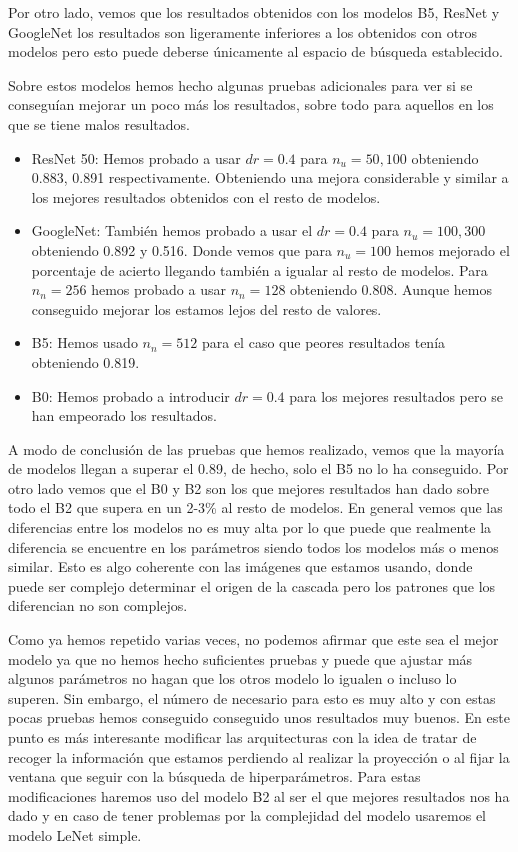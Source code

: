 \documentclass[a4paper,12pt,twoside,titlepage]{article}
\begin{document}
Por otro lado, vemos que los resultados obtenidos con los modelos B5, ResNet y GoogleNet los resultados son ligeramente inferiores a los obtenidos con otros modelos pero esto puede deberse únicamente al espacio de búsqueda establecido.

Sobre estos modelos hemos hecho algunas pruebas adicionales para ver si se conseguían mejorar un poco más los resultados, sobre todo para aquellos en los que se tiene malos resultados.

\begin{itemize}
  \item ResNet 50: Hemos probado a usar $dr = 0.4$ para $n_u = 50, 100$ obteniendo 0.883, 0.891 respectivamente. Obteniendo una mejora considerable y similar a los mejores resultados obtenidos con el resto de modelos.
  \item GoogleNet: También hemos probado a usar el $dr = 0.4$ para $n_u = 100, 300$ obteniendo 0.892 y 0.516. Donde vemos que para $n_u = 100$ hemos mejorado el porcentaje de acierto llegando también a igualar al resto de modelos. Para $n_n=256$ hemos probado a usar $n_n = 128$ obteniendo 0.808. Aunque hemos conseguido mejorar los estamos lejos del resto de valores.
  \item B5: Hemos usado $n_n = 512$ para el caso que peores resultados tenía obteniendo 0.819.
  \item B0: Hemos probado a introducir $dr = 0.4$ para los mejores resultados pero se han empeorado los resultados.
\end{itemize}

A modo de conclusión de las pruebas que hemos realizado, vemos que la mayoría de  modelos llegan a superar el 0.89, de hecho, solo el B5 no lo ha conseguido. Por otro lado vemos que el B0 y B2 son los que mejores resultados han dado sobre todo el B2 que supera en un 2-3\% al resto de modelos. En general vemos que las diferencias entre los modelos no es muy alta por lo que puede que realmente la diferencia se encuentre en los parámetros siendo todos los modelos más o menos similar. Esto es algo coherente con las imágenes que estamos usando, donde puede ser complejo determinar el origen de la cascada pero los patrones que los diferencian no son complejos.

Como ya hemos repetido varias veces, no podemos afirmar que este sea el mejor modelo ya que no hemos hecho suficientes pruebas y puede que ajustar más algunos parámetros no hagan que los otros modelo lo igualen o incluso lo superen. Sin embargo, el número de necesario para esto es muy alto y con estas pocas pruebas hemos conseguido conseguido unos resultados muy buenos. En este punto es más interesante modificar las arquitecturas con la idea de tratar de recoger la información que estamos perdiendo al realizar la proyección o al fijar la ventana que seguir con la búsqueda de hiperparámetros. Para estas modificaciones haremos uso del modelo B2 al ser el que mejores resultados nos ha dado y en caso de tener problemas por la complejidad del modelo usaremos el modelo LeNet simple.
\end{document}
